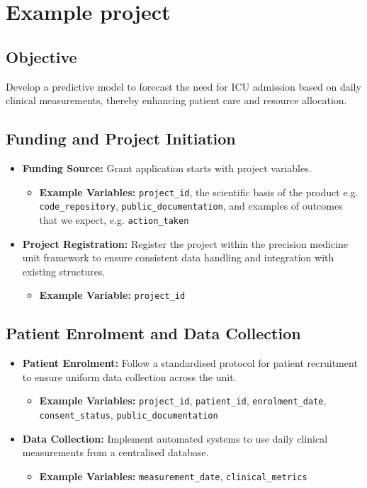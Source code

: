 \section{Example project}

\subsection*{Objective}
Develop a predictive model to forecast the need for ICU admission based on daily clinical measurements, thereby enhancing patient care and resource allocation.

\subsection*{Funding and Project Initiation}
\begin{itemize}
    \item \textbf{Funding Source:} Grant application starts with project variables.
        \begin{itemize}
        \item \textbf{Example Variables:} \texttt{project\_id}, the scientific basis of the product e.g. \texttt{code\_repository}, \texttt{public\_documentation},
    and examples of outcomes that we expect, e.g. \texttt{action\_taken}
    \end{itemize}
    \item \textbf{Project Registration:} Register the project within the precision medicine unit framework to ensure consistent data handling and integration with existing structures.
    \begin{itemize}
        \item \textbf{Example Variable:} \texttt{project\_id}
    \end{itemize}
\end{itemize}

\subsection*{Patient Enrolment and Data Collection}
\begin{itemize}
    \item \textbf{Patient Enrolment:} Follow a standardised protocol for patient recruitment to ensure uniform data collection across the unit.
    \begin{itemize}
        \item \textbf{Example Variables:}  \texttt{project\_id}, \texttt{patient\_id}, \texttt{enrolment\_date}, \texttt{consent\_status}, \texttt{public\_documentation}
    \end{itemize}
    \item \textbf{Data Collection:} Implement automated systems to use daily clinical measurements from a centralised database.
    \begin{itemize}
        \item \textbf{Example Variables:} \texttt{measurement\_date}, \texttt{clinical\_metrics}
    \end{itemize}
\end{itemize}

